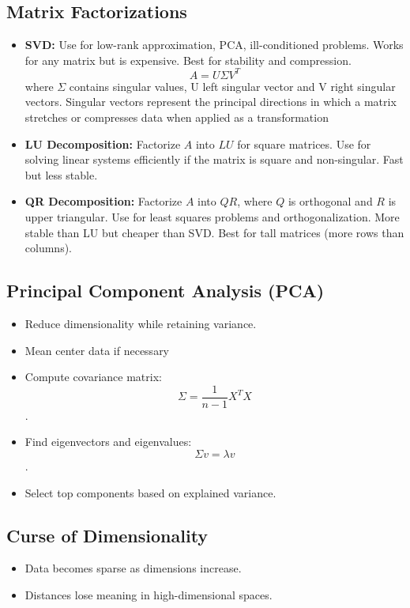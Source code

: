 \documentclass[12pt,a4paper]{article}
\begin{document}
\subsection{Matrix Factorizations}
\begin{itemize}
    \item \textbf{SVD:} Use for low-rank approximation, PCA, ill-conditioned problems. Works for any matrix but is expensive. Best for stability and compression. \[ A = U \Sigma V^T \]  where $\Sigma$ contains singular values, U left singular vector and V right singular vectors. Singular vectors represent the principal directions in which a matrix stretches or compresses data when applied as a transformation
    \item \textbf{LU Decomposition:} Factorize $A$ into $LU$ for square matrices. Use for solving linear systems efficiently if the matrix is square and non-singular. Fast but less stable.
    \item \textbf{QR Decomposition:} Factorize $A$ into $QR$, where $Q$ is orthogonal and $R$ is upper triangular. Use for least squares problems and orthogonalization. More stable than LU but cheaper than SVD. Best for tall matrices (more rows than columns).
\end{itemize}
\subsection{Principal Component Analysis (PCA)}
\begin{itemize}
    \item Reduce dimensionality while retaining variance.
    \item Mean center data if necessary
    \item Compute covariance matrix: \[ \Sigma = \frac{1}{n-1} X^T X \].
    \item Find eigenvectors and eigenvalues: \[ \Sigma v = \lambda v \].
    \item Select top components based on explained variance.
\end{itemize}

\subsection{Curse of Dimensionality}
\begin{itemize}
    \item Data becomes sparse as dimensions increase.
    \item Distances lose meaning in high-dimensional spaces.
\end{itemize}
\end{document}
